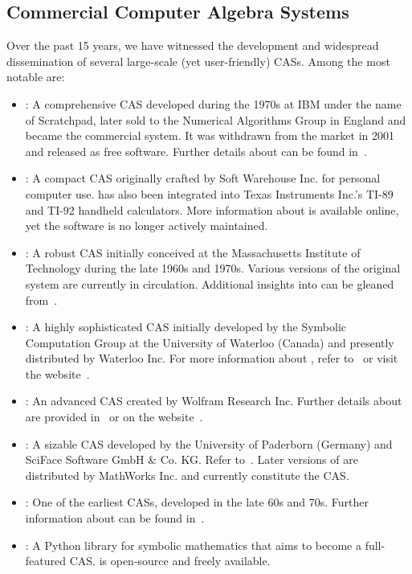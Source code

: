 \subsection{Commercial Computer Algebra Systems}

Over the past 15 years, we have witnessed the development and widespread dissemination of several large-scale (yet user-friendly) \acp{CAS}. Among the most notable are:
%
\begin{itemize}
  \setlength{\itemsep}{0.0em}
  \item \Axiom{}: A comprehensive \ac{CAS} developed during the 1970s at IBM under the name of Scratchpad, later sold to the Numerical Algorithms Group in England and became the \Axiom{} commercial system. It was withdrawn from the market in 2001 and released as free software. Further details about \Axiom{} can be found in~\cite{jenks1992axiom}.
  \item \Derive{}: A compact \ac{CAS} originally crafted by Soft Warehouse Inc. for personal computer use. \Derive{} has also been integrated into Texas Instruments Inc.'s TI-89 and TI-92 handheld calculators. More information about \Derive{} is available online, yet the software is no longer actively maintained.
  \item \Macsyma{}: A robust \ac{CAS} initially conceived at the Massachusetts Institute of Technology during the late 1960s and 1970s. Various versions of the original \Macsyma{} system are currently in circulation. Additional insights into \Macsyma{} can be gleaned from~\cite{wester1999computer}.
  \item \Maple{}: A highly sophisticated \ac{CAS} initially developed by the Symbolic Computation Group at the University of Waterloo (Canada) and presently distributed by Waterloo \Maple{} Inc. For more information about \Maple{}, refer to~\cite{heck2003introduction} or visit the website~\cite{maple}.
  \item \Mathematica{}: An advanced \ac{CAS} created by Wolfram Research Inc. Further details about \Mathematica{} are provided in~\cite{wolfram2003mathematica} or on the website~\cite{mathematica}.
  \item \MuPAD{}: A sizable \ac{CAS} developed by the University of Paderborn (Germany) and SciFace Software GmbH \& Co. KG. Refer to~\cite{creutzig2004mupad}. Later versions of \MuPAD{} are distributed by MathWorks Inc. and currently constitute the \Matlab{} \ac{CAS}.
  \item \Reduce{}: One of the earliest \acp{CAS}, developed in the late 60s and 70s. Further information about \Reduce{} can be found in~\cite{rayna1987reduce}.
  \item \SymPy{}: A Python library for symbolic mathematics that aims to become a full-featured \ac{CAS}. \SymPy{} is open-source and freely available.
\end{itemize}
